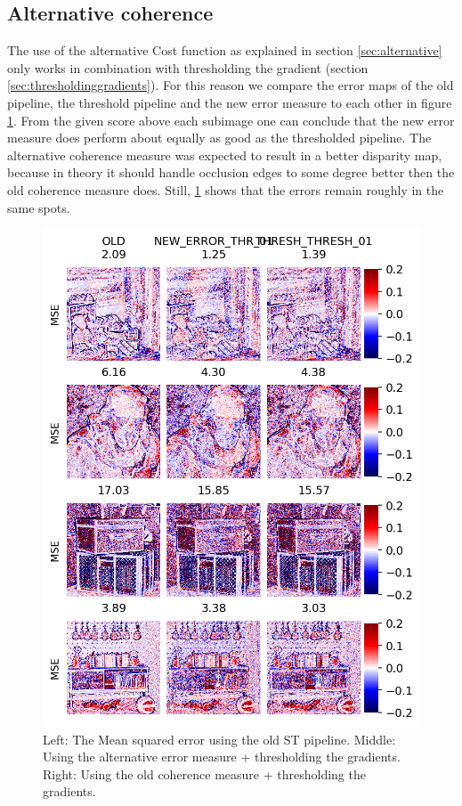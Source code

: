 \documentclass  [
  paper    = a4,
  BCOR     = 10mm,
  twoside,
  fontsize = 12pt,
  fleqn,
  toc      = bibnumbered,
  toc      = listofnumbered,
  numbers  = noendperiod,
  headings = normal,
  listof   = leveldown,
  version  = 3.03
]                                       {scrreprt}
\begin{document}
\subsection{Alternative coherence}
The use of the alternative Cost function as explained in section \ref{sec:alternative} only works in combination with thresholding the gradient (section \ref{sec:thresholdinggradients}). For this reason we compare the error maps of the old pipeline, the threshold pipeline and the new error measure to each other in figure \ref{fig:threshvsoldvsnewerror}. From the given score above each subimage one can conclude that the new error measure does perform about equally as good as the thresholded pipeline. The alternative coherence measure was expected to result in a better disparity map, because in theory it should handle occlusion edges to some degree better then the old coherence measure does. Still, \ref{fig:threshvsoldvsnewerror} shows that the errors remain roughly in the same spots.


\begin{figure}
	\centering
	\includegraphics[width=0.7\linewidth]{images/thresh_vs_old_vs_newerror}
	\caption[Comparing alternative coherence to new coherence]{Left: The Mean squared error using the old ST pipeline. Middle: Using the alternative error measure + thresholding the gradients. Right: Using the old coherence measure + thresholding the gradients.}
	\label{fig:threshvsoldvsnewerror}
\end{figure}
\end{document}
